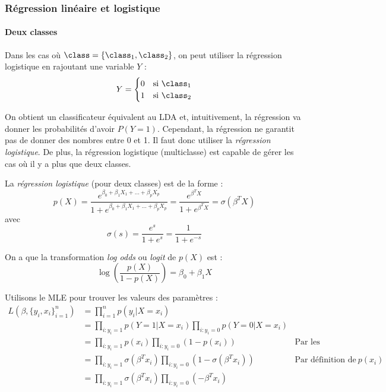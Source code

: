     \subsubsection{Régression linéaire et logistique}
        \paragraph{Deux classes}
        Dans les cas où \(\class = \{\class_1, \class_2\}\), on peut utiliser la régression logistique en rajoutant une variable \(Y\) :
        \[
            Y = \begin{cases}
                0 & \text{si } \class_1\\
                1 & \text{si } \class_2
            \end{cases}
        \]

        On obtient un classificateur équivalent au LDA et, intuitivement, la régression va donner les probabilités d'avoir \(P(Y = 1)\). Cependant, la régression ne garantit pas de donner des nombres entre 0 et 1. Il faut donc utiliser la \textit{régression logistique}. De plus, la régression logistique (multiclasse) est capable de gérer les cas où il y a plus que deux classes.

        \begin{definition}
            La \textit{régression logistique} (pour deux classes) est de la forme :
            \[
                p(X) = \frac{e^{\beta_0 + \beta_1 X_1 + \dots + \beta_pX_p}}{1 + e^{\beta_0 + \beta_1X_1 + \dots + \beta_pX_p}} = \frac{e^{\beta^TX}}{1 + e^{\beta^TX}} = \sigma(\beta^TX)
            \] 
            avec \[\sigma(s) = \frac{e^s}{1+e^s} = \frac{1}{1 + e^{-s}}\]

            On a que la transformation \textit{log odds} ou \textit{logit} de \(p(X)\) est :
            \[
                \log\left(\frac{p(X)}{1 - p(X)}\right) = \beta_0 + \beta_1X
            \]
        \end{definition}

        Utilisons le MLE pour trouver les valeurs des paramètres :
        \begin{align*}
            L(\beta, \{y_i, x_i\}_{i=1}^n) &= \prod_{i=1}^n p(y_i | X = x_i)\\
            &= \prod_{i:y_i = 1} p(Y = 1|X = x_i) \prod_{i:y_i=0} p(Y = 0 | X = x_i)\\
            &= \prod_{i:y_i = 1} p(x_i) \prod_{i:y_i = 0} (1 - p(x_i)) & \text{Par les probabilités}\\
            &= \prod_{i:y_i = 1} \sigma(\beta^T x_i) \prod_{i:y_i=0} (1 - \sigma(\beta^T x_i)) & \text{Par définition de } p(x_i)\\
            &= \prod_{i:y_i = 1} \sigma(\beta^T x_i) \prod_{i:y_i=0} (-\beta^T x_i)
        \end{align*}

